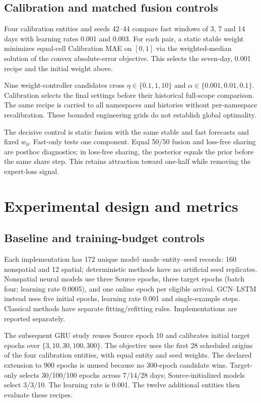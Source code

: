 \documentclass[pdflatex,iicol,sn-mathphys-num]{sn-jnl}
\begin{document}
\subsection{Calibration and matched fusion controls}
Four calibration entities and seeds 42--44 compare fast windows of 3, 7 and 14 days with learning rates 0.001 and 0.003. For each pair, a static stable weight minimizes equal-cell Calibration MAE on $[0,1]$ via the weighted-median solution of the convex absolute-error objective. This selects the seven-day, 0.001 recipe and the initial weight above.

Nine weight-controller candidates cross $\eta\in\{0.1,1,10\}$ and $\alpha\in\{0.001,0.01,0.1\}$. Calibration selects the final settings before their historical full-scope comparison. The same recipe is carried to all namespaces and histories without per-namespace recalibration. These bounded engineering grids do not establish global optimality.

The decisive control is static fusion with the same stable and fast forecasts and fixed $w_0$. Fast-only tests one component. Equal 50/50 fusion and loss-free sharing are posthoc diagnostics; in loss-free sharing, the posterior equals the prior before the same share step. This retains attraction toward one-half while removing the expert-loss signal.

\section{Experimental design and metrics}
\subsection{Baseline and training-budget controls}
Each implementation has 172 unique model--mode--entity--seed records: 160 nonspatial and 12 spatial; deterministic methods have no artificial seed replicates. Nonspatial neural models use three Source epochs, three target epochs (batch four; learning rate 0.0005), and one online epoch per eligible arrival. GCN--LSTM instead uses five initial epochs, learning rate 0.001 and single-example steps. Classical methods have separate fitting/refitting rules. Implementations are reported separately.

The subsequent GRU study reuses Source epoch 10 and calibrates initial target epochs over $\{3,10,30,100,300\}$. The objective uses the first 28 scheduled origins of the four calibration entities, with equal entity and seed weights. The declared extension to 900 epochs is unused because no 300-epoch candidate wins. Target-only selects 30/100/100 epochs across 7/14/28 days; Source-initialized models select 3/3/10. The learning rate is 0.001. The twelve additional entities then evaluate these recipes.
\end{document}
